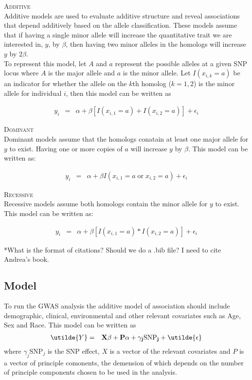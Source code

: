 \documentclass[11pt]{article}\usepackage[]{graphicx}\usepackage[]{color}
\begin{document}
\textsc{Additive}\\
Additive models are used to evaluate additive structure and reveal associations that depend additively based on the allele classification. These models assume that if having a single minor allele will increase the quantitative trait we are interested in, $y$, by $\beta$, then having two minor alleles in the homologs will increase $y$ by $2\beta$. \\
To represent this model, let $A$ and $a$ represent the possible alleles at a given SNP locus where $A$ is the major allele and $a$ is the minor allele. Let $I(x_{i,k} = a)$ be an indicator for whether the allele on the $k$th homolog ($k = 1,2$) is the minor allele for individual $i$, then this model can be written as 

\begin{eqnarray}
y_i &=& \alpha + \beta [I(x_{i,1} = a) + I(x_{i,2} = a)] + \epsilon_i
\end{eqnarray}

\textsc{Dominant}\\
Dominant models assume that the homologs conatain at least one major allele for $y$ to exist. Having one or more copies of $a$ will increase $y$ by $\beta$. This model can be written as:

\begin{eqnarray}
y_i &=& \alpha + \beta I(x_{i,1} = a \; \text{or} \; x_{i,2} = a) + \epsilon_i
\end{eqnarray}

\textsc{Recessive}\\
Recessive models assume both homologs contain the minor allele for $y$ to exist. This model can be written as:

\begin{eqnarray}
y_i &=& \alpha + \beta [I(x_{i,1} = a) * I(x_{i,2} = a)] + \epsilon_i
\end{eqnarray}

*What is the format of citations? Should we do a .bib file? I need to cite Andrea's book.


\subsection{Model}

To run the GWAS analysis the additive model of association should include demographic, clinical, environmental and other relevant covariates such as Age, Sex and Race. This model can be written as
\begin{eqnarray*}
\utilde{Y} &=& \bf{X} \bf{\beta} + \bf{P} \alpha + \gamma _j \text{SNP} _j + \utilde{\epsilon}
\end{eqnarray*}
where $\gamma _j \text{SNP} _j$ is the SNP effect, $X$ is a vector of the relevant covariates and $P$ is a vector of principle comonents, the demension of which depends on the number of principle components chosen to be used in the analysis.\\
\end{document}
